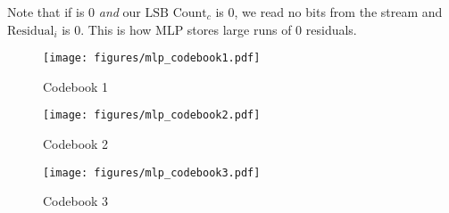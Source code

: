 Note that if  is 0 \textit{and} our $\text{LSB Count}_c$ is 0,
we read no bits from the stream and $\text{Residual}_i$ is 0.
This is how MLP stores large runs of 0 residuals.

\clearpage

\begin{figure}[h]
\label{mlp_codebooks}
\texttt{[image: figures/mlp\_codebook1.pdf]}
\caption{Codebook 1}
\texttt{[image: figures/mlp\_codebook2.pdf]}
\caption{Codebook 2}
\texttt{[image: figures/mlp\_codebook3.pdf]}
\caption{Codebook 3}
\end{figure}

\clearpage

